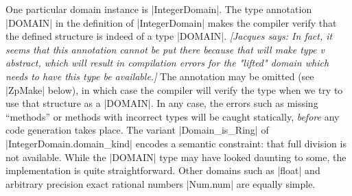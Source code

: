 \documentclass{elsart}
\newcommand{\jacques}[1]{{\it [Jacques says: #1]}}
\begin{document}
One particular domain instance is |IntegerDomain|. The type annotation
|DOMAIN| in the definition of |IntegerDomain| makes the 
compiler verify that the defined structure is indeed of a type |DOMAIN|. 
\jacques{In fact, it seems that this annotation cannot be put there
because that will make type v abstract, which will result in compilation
errors for the "lifted" domain which needs to have this type be
available.}
The annotation may be omitted (see |ZpMake| below), in which
case the compiler will verify the type when we try to use that structure as a
|DOMAIN|. In any case, the errors such as missing ``methods'' or
methods with incorrect types will be caught statically, 
\emph{before} any code generation takes place. The variant
|Domain_is_Ring| of |IntegerDomain.domain_kind| encodes a semantic constraint:
that full division
is not available. While the |DOMAIN| type may have looked daunting to
some, the implementation is quite straightforward.  Other domains such
as |float| and arbitrary precision exact rational numbers |Num.num|
are equally simple.
\end{document}
